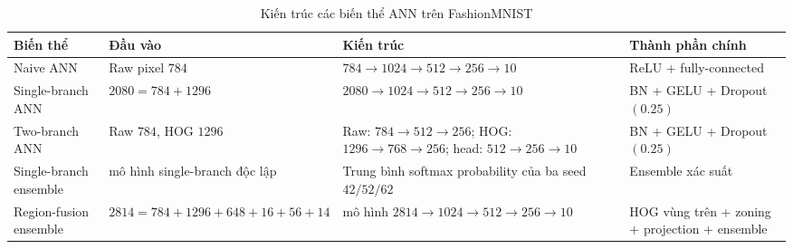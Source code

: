 \begin{table}[H]
\centering
\caption{Kiến trúc các biến thể ANN trên FashionMNIST}
\label{tab:fashion-ann-architecture-details}
\small
\begin{tabularx}{\textwidth}{>{\raggedright\arraybackslash}p{3cm} >{\raggedright\arraybackslash}p{3.2cm} >{\raggedright\arraybackslash}X >{\raggedright\arraybackslash}p{3.1cm}}
\toprule
Biến thể & Đầu vào & Kiến trúc & Thành phần chính \\
\midrule
Naive ANN & Raw pixel $784$ & $784 \rightarrow 1024 \rightarrow 512 \rightarrow 256 \rightarrow 10$ & ReLU + fully-connected \\
Single-branch ANN & $2080 = 784 + 1296$ & $2080 \rightarrow 1024 \rightarrow 512 \rightarrow 256 \rightarrow 10$ & BN + GELU + Dropout$(0.25)$ \\
Two-branch ANN & Raw $784$, HOG $1296$ & Raw: $784 \rightarrow 512 \rightarrow 256$; HOG: $1296 \rightarrow 768 \rightarrow 256$; head: $512 \rightarrow 256 \rightarrow 10$ & BN + GELU + Dropout$(0.25)$ \\
Single-branch ensemble & 3 mô hình single-branch độc lập & Trung bình softmax probability của ba seed $42/52/62$ & Ensemble xác suất \\
Region-fusion ensemble & $2814 = 784 + 1296 + 648 + 16 + 56 + 14$ & 3 mô hình $2814 \rightarrow 1024 \rightarrow 512 \rightarrow 256 \rightarrow 10$ & HOG vùng trên + zoning + projection + ensemble \\
\bottomrule
\end{tabularx}
\end{table}
